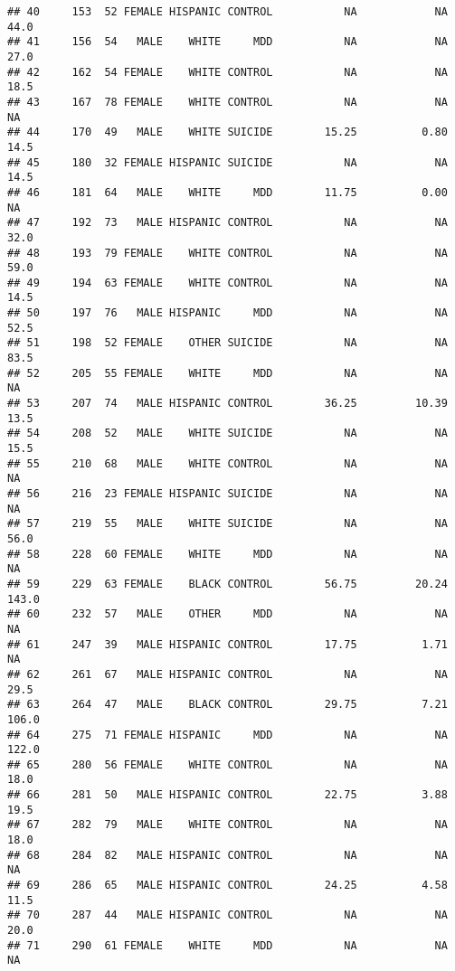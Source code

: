 \documentclass[]{article}
\begin{document}
\begin{verbatim}
## 40     153  52 FEMALE HISPANIC CONTROL           NA            NA         44.0
## 41     156  54   MALE    WHITE     MDD           NA            NA         27.0
## 42     162  54 FEMALE    WHITE CONTROL           NA            NA         18.5
## 43     167  78 FEMALE    WHITE CONTROL           NA            NA           NA
## 44     170  49   MALE    WHITE SUICIDE        15.25          0.80         14.5
## 45     180  32 FEMALE HISPANIC SUICIDE           NA            NA         14.5
## 46     181  64   MALE    WHITE     MDD        11.75          0.00           NA
## 47     192  73   MALE HISPANIC CONTROL           NA            NA         32.0
## 48     193  79 FEMALE    WHITE CONTROL           NA            NA         59.0
## 49     194  63 FEMALE    WHITE CONTROL           NA            NA         14.5
## 50     197  76   MALE HISPANIC     MDD           NA            NA         52.5
## 51     198  52 FEMALE    OTHER SUICIDE           NA            NA         83.5
## 52     205  55 FEMALE    WHITE     MDD           NA            NA           NA
## 53     207  74   MALE HISPANIC CONTROL        36.25         10.39         13.5
## 54     208  52   MALE    WHITE SUICIDE           NA            NA         15.5
## 55     210  68   MALE    WHITE CONTROL           NA            NA           NA
## 56     216  23 FEMALE HISPANIC SUICIDE           NA            NA           NA
## 57     219  55   MALE    WHITE SUICIDE           NA            NA         56.0
## 58     228  60 FEMALE    WHITE     MDD           NA            NA           NA
## 59     229  63 FEMALE    BLACK CONTROL        56.75         20.24        143.0
## 60     232  57   MALE    OTHER     MDD           NA            NA           NA
## 61     247  39   MALE HISPANIC CONTROL        17.75          1.71           NA
## 62     261  67   MALE HISPANIC CONTROL           NA            NA         29.5
## 63     264  47   MALE    BLACK CONTROL        29.75          7.21        106.0
## 64     275  71 FEMALE HISPANIC     MDD           NA            NA        122.0
## 65     280  56 FEMALE    WHITE CONTROL           NA            NA         18.0
## 66     281  50   MALE HISPANIC CONTROL        22.75          3.88         19.5
## 67     282  79   MALE    WHITE CONTROL           NA            NA         18.0
## 68     284  82   MALE HISPANIC CONTROL           NA            NA           NA
## 69     286  65   MALE HISPANIC CONTROL        24.25          4.58         11.5
## 70     287  44   MALE HISPANIC CONTROL           NA            NA         20.0
## 71     290  61 FEMALE    WHITE     MDD           NA            NA           NA

\end{verbatim}
\end{document}

